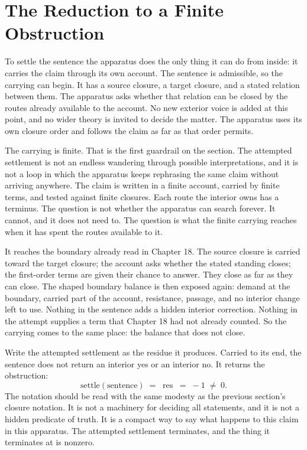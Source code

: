 \section{The Reduction to a Finite Obstruction}

To settle the sentence the apparatus does the only thing it can do from inside: it carries the
claim through its own account. The sentence is admissible, so the carrying can begin. It has a
source closure, a target closure, and a stated relation between them. The apparatus asks whether
that relation can be closed by the routes already available to the account. No new exterior
voice is added at this point, and no wider theory is invited to decide the matter. The apparatus
uses its own closure order and follows the claim as far as that order permits.

The carrying is finite. That is the first guardrail on the section. The attempted settlement is
not an endless wandering through possible interpretations, and it is not a loop in which the
apparatus keeps rephrasing the same claim without arriving anywhere. The claim is written in a
finite account, carried by finite terms, and tested against finite closures. Each route the
interior owns has a terminus. The question is not whether the apparatus can search forever. It
cannot, and it does not need to. The question is what the finite carrying reaches when it has
spent the routes available to it.

It reaches the boundary already read in Chapter 18. The source closure is carried toward the
target closure; the account asks whether the stated standing closes; the first-order terms are
given their chance to answer. They close as far as they can close. The shaped boundary balance is
then exposed again: demand at the boundary, carried part of the account, resistance, passage,
and no interior change left to use. Nothing in the sentence adds a hidden interior correction.
Nothing in the attempt supplies a term that Chapter 18 had not already counted. So the carrying
comes to the same place: the balance that does not close.

Write the attempted settlement as the residue it produces. Carried to its end, the sentence does
not return an interior yes or an interior no. It returns the obstruction:
\[
  \text{settle}(\text{sentence}) \;=\; \operatorname{res} \;=\; -1 \;\neq\; 0 .
\]
The notation should be read with the same modesty as the previous section's closure notation. It
is not a machinery for deciding all statements, and it is not a hidden predicate of truth. It is
a compact way to say what happens to this claim in this apparatus. The attempted settlement
terminates, and the thing it terminates at is nonzero.

